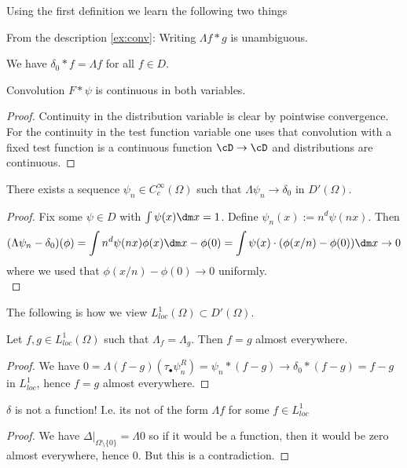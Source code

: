 	Using the first definition we learn the following two things
	\begin{example}
		From the description \ref{ex:conv}: Writing $\Lambda f * g$ is unambiguous.
	\end{example}
	\begin{example}
		We have $\delta_0 * f = \Lambda f$ for all $f \in D$.
	\end{example}
	\begin{lemma}{\label{lemma:cont}}
		Convolution $F * \psi$ is continuous in both variables.
	\end{lemma}
	\begin{proof}
		Continuity in the distribution variable is clear by pointwise convergence. \\
		For the continuity in the test function variable one uses that convolution with a fixed test function is a continuous function $\cD \to \cD$ and distributions are continuous.
	\end{proof}
	\begin{proposition}{\label{proposition:deltaInClosure}}
		There exists a sequence $\psi_n \in C_c^{\infty}(\Omega)$ such that $\Lambda \psi_n \to \delta_0$ in $D'(\Omega)$.
	\end{proposition}
	\begin{proof}
		Fix some $\psi \in D$ with $\int \psi(x) \dm x = 1$. Define $\psi_n (x) := n^d \psi(nx)$. Then
		\[
		(\Lambda \psi_n - \delta_0) (\phi )  = \int n^d \psi (n x) \phi(x) \dm x - \phi(0) = \int \psi (x) \cdot (\phi(x / n) - \phi(0)) \dm x \to 0
		\]
		where we used that $\phi(x/n) - \phi(0) \to 0$ uniformly. \\
	\end{proof}
	The following is how we view $L^1_{loc}(\Omega) \subset D'(\Omega)$.
	\begin{corollary}
		Let $f,g \in L^1_{loc}(\Omega)$ such that $\Lambda_f = \Lambda_g$. Then $f = g$ almost everywhere.
	\end{corollary}
	\begin{proof}
		We have $0 = \Lambda(f-g)(\tau_{\bullet} \psi_n^R) = \psi_n * (f - g) \to \delta_0 * (f-g) = f-g$ in $L^1_{loc}$, hence $f = g$ almost everywhere.
	\end{proof}
	\begin{example}
		$\delta$ is not a function! I.e. its not of the form $\Lambda f$ for some $f \in L^1_{loc}$
	\end{example}
	\begin{proof}
		We have $\Delta|_{\Omega \setminus \{0\}}= \Lambda 0$ so if it would be a function, then it would be zero almost everywhere, hence 0. But this is a contradiction.
	\end{proof}
